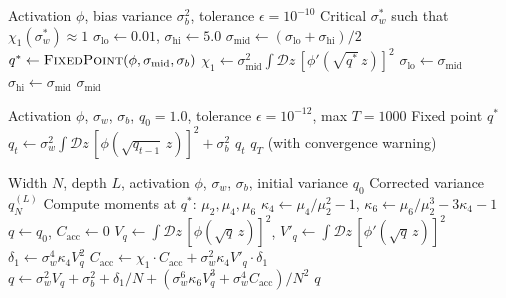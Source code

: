 \documentclass[10pt]{article}
\begin{document}
\begin{algorithm}[h]
\caption{Edge-of-Chaos $\sigma_w^*$ Computation via Bisection}
\label{alg:eoc}
\begin{algorithmic}[1]
\Require Activation $\phi$, bias variance $\sigma_b^2$, tolerance $\epsilon = 10^{-10}$
\Ensure Critical $\sigma_w^*$ such that $\chi_1(\sigma_w^*) \approx 1$
\State $\sigma_{\text{lo}} \gets 0.01$, $\sigma_{\text{hi}} \gets 5.0$
    \State $\sigma_{\text{mid}} \gets (\sigma_{\text{lo}} + \sigma_{\text{hi}}) / 2$
    \State $q^* \gets \textsc{FixedPoint}(\phi, \sigma_{\text{mid}}, \sigma_b)$
    \State $\chi_1 \gets \sigma_{\text{mid}}^2 \int \mathcal{D}z\, [\phi'(\sqrt{q^*}\, z)]^2$
     $\sigma_{\text{lo}} \gets \sigma_{\text{mid}}$
    \Else{} $\sigma_{\text{hi}} \gets \sigma_{\text{mid}}$
    \EndIf
\EndWhile
\State \Return $\sigma_{\text{mid}}$
\end{algorithmic}
\end{algorithm}

\begin{algorithm}[h]
\caption{Variance Map Fixed-Point Iteration}
\label{alg:fixed-point}
\begin{algorithmic}[1]
\Require Activation $\phi$, $\sigma_w$, $\sigma_b$, $q_0 = 1.0$, tolerance $\epsilon = 10^{-12}$, max $T = 1000$
\Ensure Fixed point $q^*$
    \State $q_t \gets \sigma_w^2 \int \mathcal{D}z\, [\phi(\sqrt{q_{t-1}}\, z)]^2 + \sigma_b^2$
     \Return $q_t$
    \EndIf
\EndFor
\State \Return $q_T$ (with convergence warning)
\end{algorithmic}
\end{algorithm}

\begin{algorithm}[h]
\caption{$O(1/N^2)$ Finite-Width Variance Correction}
\label{alg:finite-width}
\begin{algorithmic}[1]
\Require Width $N$, depth $L$, activation $\phi$, $\sigma_w$, $\sigma_b$, initial variance $q_0$
\Ensure Corrected variance $q_N^{(L)}$
\State Compute moments at $q^*$: $\mu_2, \mu_4, \mu_6$
\State $\kappa_4 \gets \mu_4/\mu_2^2 - 1$, $\kappa_6 \gets \mu_6/\mu_2^3 - 3\kappa_4 - 1$
\State $q \gets q_0$, $C_{\mathrm{acc}} \gets 0$
    \State $V_q \gets \int \mathcal{D}z\, [\phi(\sqrt{q}\, z)]^2$, $V'_q \gets \int \mathcal{D}z\, [\phi'(\sqrt{q}\, z)]^2$
    \State $\delta_1 \gets \sigma_w^4 \kappa_4 V_q^2$
    \State $C_{\mathrm{acc}} \gets \chi_1 \cdot C_{\mathrm{acc}} + \sigma_w^2 \kappa_4 V'_q \cdot \delta_1$
    \State $q \gets \sigma_w^2 V_q + \sigma_b^2 + \delta_1/N + (\sigma_w^6 \kappa_6 V_q^3 + \sigma_w^4 C_{\mathrm{acc}})/N^2$
\EndFor
\State \Return $q$
\end{algorithmic}
\end{algorithm}
\end{document}
